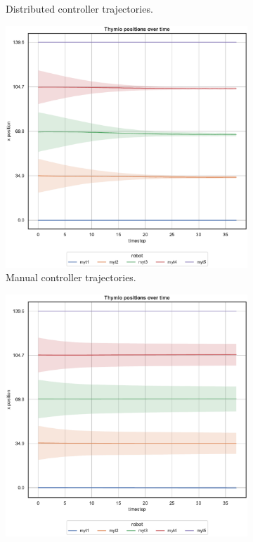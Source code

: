 \begin{figure}[H]
\begin{center}
\begin{subfigure}[h]{0.49\textwidth}
			\caption{Distributed controller trajectories.}
		\end{subfigure}
	\end{center}
	\begin{center}
		\begin{subfigure}[h]{0.49\textwidth}
			\centering
			\includegraphics[width=.9\textwidth]{contents/images/net-d9/position-overtime-manual}%
			\caption{Manual controller trajectories.}
		\end{subfigure}
		\hfill
		\begin{subfigure}[h]{0.49\textwidth}
			\centering
			\includegraphics[width=.9\textwidth]{contents/images/net-d9/position-overtime-learned_distributed}

\end{subfigure}
\end{center}
\end{figure}
